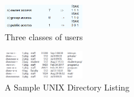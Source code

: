 \begin{figure}[!htb]%
    \centering
    \includegraphics[width=0.309\textwidth]{pic/OS10/Three classes of users}
    \caption{Three classes of users}
\end{figure}


\begin{figure}[!htb]
    \centering
    \includegraphics[width=0.309\textwidth]{pic/OS10/A Sample UNIX Directory Listing}
    \caption{A Sample UNIX Directory Listing}
\end{figure}
